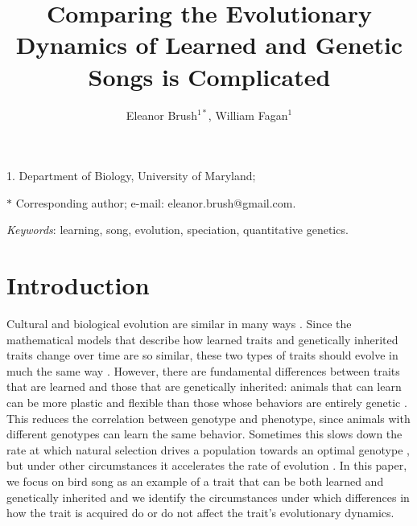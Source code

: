 \documentclass[12pt]{article}
\title{Comparing the Evolutionary Dynamics of Learned and Genetic Songs is Complicated}
\author{Eleanor Brush$^{1\ast}$, William Fagan$^{1}$}
\date{}
\begin{document}
\maketitle

\noindent{} 1. Department of Biology, University of Maryland;

\noindent{} $\ast$ Corresponding author; e-mail: eleanor.brush@gmail.com.


\bigskip

\textit{Keywords}: learning, song, evolution, speciation, quantitative genetics.

\bigskip

\bigskip

\thispagestyle{fancy}
\newpage{}

\section*{Introduction}

Cultural and biological evolution are similar in many ways \cite{Mesoudi:2006fk}. Since the mathematical models that describe how learned traits and genetically inherited traits change over time are so similar, these two types of traits should evolve in much the same way \cite{Mesoudi:2006fk}. However, there are fundamental differences between traits that are learned and those that are genetically inherited: animals that can learn can be more plastic and flexible than those whose behaviors are entirely genetic \cite{Ancel:2000vn,Anderson:1995ys}. This reduces the correlation between genotype and phenotype, since animals with different genotypes can learn the same behavior. Sometimes this slows down the rate at which natural selection drives a population towards an optimal genotype \cite{Lachlan:2004tg,Ancel:2000vn,Anderson:1995ys}, but under other circumstances it accelerates the rate of evolution \cite{Ancel:2000vn}. In this paper, we focus on bird song as an example of a trait that can be both learned and genetically inherited and we identify the circumstances under which differences in how the trait is acquired do or do not affect the trait's evolutionary dynamics.
\end{document}
